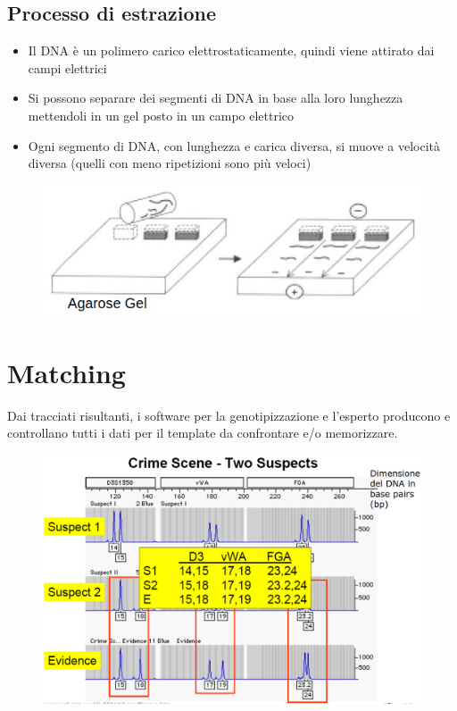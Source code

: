 \documentclass{report}
\begin{document}
\subsection{Processo di estrazione}
\begin{itemize}
    \item Il DNA è un polimero carico elettrostaticamente, quindi viene attirato dai campi elettrici 
    \item Si possono separare dei segmenti di DNA in base alla loro lunghezza mettendoli in un gel posto in un campo elettrico 
    \item Ogni segmento di DNA, con lunghezza e carica diversa, si muove a velocità diversa (quelli con meno ripetizioni sono più veloci)
\end{itemize} 

\begin{figure}[ht]
    \centering
    \includegraphics[width=0.8\linewidth]{images/estrazione.png}
\end{figure}

\newpage
\section{Matching}
Dai tracciati risultanti, i software per la genotipizzazione 
e l'esperto producono e controllano tutti i dati per il template 
da confrontare e/o memorizzare.

\begin{figure}[ht]
    \centering
    \includegraphics[width=1\linewidth]{images/matching.png}
\end{figure}
\end{document}
